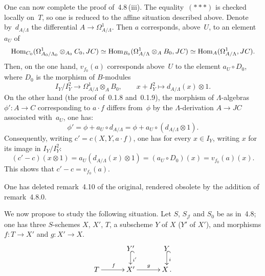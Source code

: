 {\renewcommand{\thefootnote}{(97)}}%
One can now complete the proof of~4.8\,(iii). The equality~\((\ast\ast\ast)\)
is checked locally on~\(T\), so one is reduced to the affine situation
described above.
Denote by~\(d_{A/\Lambda}\) the differential \(A\to\Omega^1_{A/\Lambda}\). Then
\(a\) corresponds, above~\(U\), to an element~\(a_U\) of
\[
\operatorname{Hom}_{C_0}(\Omega^1_{A_0/\Lambda_0}\otimes_{A_0}C_0,JC)
\simeq
\operatorname{Hom}_{B_0}(\Omega^1_{A/\Lambda}\otimes_A B_0,JC)
\simeq
\operatorname{Hom}_A(\Omega^1_{A/\Lambda},JC).
\]
Then, on the one hand, \(v_{f_0}(a)\) corresponds above~\(U\) to the
element \(a_U\circ D_0\), where \(D_0\) is the morphism of
\(B\)-modules%
{\renewcommand{\thefootnote}{(98)}}
\[
I_Y/I_Y^2\longrightarrow\Omega^1_{A/\Lambda}\otimes_A B_0,
\qquad
x+I_Y^2\mapsto d_{A/\Lambda}(x)\otimes 1.
\]
On the other hand (\cf the proof of~0.1.8 and~0.1.9), the morphism of
\(\Lambda\)-algebras \(\phi'\colon A\to C\) corresponding to \(a\cdot f\)
differs from~\(\phi\) by the \(\Lambda\)-derivation \(A\to JC\) associated
with~\(a_U\), \ie one has:
\[
\phi'=\phi+a_U\circ d_{A/\Lambda}=\phi+a_U\circ(d_{A/\Lambda}\otimes 1).
\]
Consequently, writing \(c'=c(X,Y,a\cdot f)\), one has for every
\(x\in I_Y\), writing \(x\) for its image in \(I_Y/I_Y^2\):
\[
(c'-c)(x\otimes 1)
=a_U(d_{A/\Lambda}(x)\otimes 1)
=(a_U\circ D_0)(x)
=v_{f_0}(a)(x).
\]
This shows that \(c'-c=v_{f_0}(a)\).

\label{III.4.10}
One has deleted remark~4.10 of the original, rendered obsolete by the
addition of remark~4.8.0.

\label{III.4.11}
We now propose to study the following situation. Let \(S\),
\(S_{\mathcal{J}}\) and \(S_0\) be as in~4.8; one has three \(S\)-schemes
\(X\), \(X'\), \(T\), a subscheme \(Y\) of \(X\) (\resp \(Y'\) of \(X'\)), and
morphisms \(f\colon T\to X'\) and \(g\colon X'\to X\).
\[
\xymatrix@C=3.2em@R=1.6em{
& Y' \ar@{^{(}->}[d]^{i'} & Y \ar@{^{(}->}[d]^{i} \\
T \ar[r]^{f} & X' \ar[r]^{g} & X\,.
}
\]

